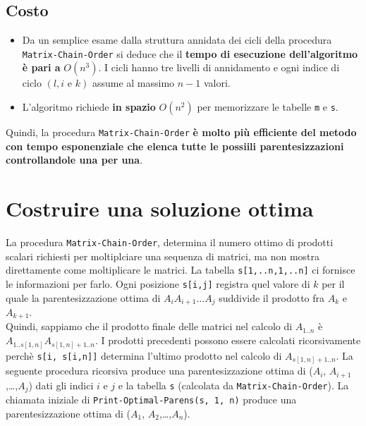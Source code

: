 \subsection{Costo}

\begin{itemize}
  \item
        Da un semplice esame dalla struttura annidata dei cicli della
        procedura \texttt{Matrix-Chain-Order} si deduce che il \textbf{tempo
          di esecuzione dell'algoritmo è pari a} $O(n^3)$. I cicli hanno tre
        livelli di annidamento e ogni indice di ciclo $(l,i \text{ e } k)$
        assume al massimo $n-1$ valori.
  \item
        L'algoritmo richiede \textbf{in spazio} $O(n^2)$ per memorizzare le
        tabelle \texttt{m} e \texttt{s}.
\end{itemize}

Quindi, la procedura \texttt{Matrix-Chain-Order} \textbf{è molto più
  efficiente del metodo con tempo esponenziale che elenca tutte le
  possiili parentesizzazioni controllandole una per una}.


\section{Costruire una soluzione ottima}

La procedura \texttt{Matrix-Chain-Order}, determina il numero ottimo di prodotti
scalari richiesti per moltiplciare una sequenza di matrici, ma non mostra
direttamente come moltiplicare le matrici. La tabella
\texttt{s{[}1,..n,1,..n{]}} ci fornisce le informazioni per farlo. Ogni
posizione \texttt{s{[}i,j{]}} registra quel valore di $k$ per il quale la
parentesizzazione ottima di $A_i A_{i+1}\ldots A_j$ suddivide il prodotto fra
$A_k$ e $A_{k+1}$.\\

Quindi, sappiamo che il prodotto finale delle matrici nel calcolo di
$A_{1..n}$ è \linebreak $A_{1..s[1,n]} A_{s[1,n]+1..n}$. I prodotti precedenti
possono essere calcolati ricorsivamente perchè
\texttt{s{[}i,\ s{[}i,n{]}{]}} determina l'ultimo prodotto nel calcolo
di $A_{s[1,n]+1..n}$. La seguente procedura ricorsiva produce una
parentesizzazione ottima di ($A_i$, $A_{i+1}$,\ldots,$A_j$) dati
gli indici $i$ e $j$ e la tabella \texttt{s} (calcolata da
\texttt{Matrix-Chain-Order}). La chiamata iniziale di
\texttt{Print-Optimal-Parens(s,\ 1,\ n)} produce una parentesizzazione
ottima di ($A_1$, $A_2$,\ldots,$A_n$).\\


